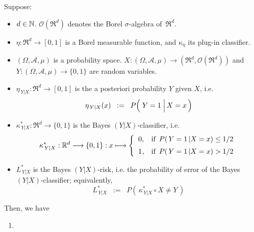 
\vskip 0.5cm
\begin{theorem}
\label{BoundOfProbabilityOfErrorsPlugInClassifier}
\mbox{}\vskip 0.1cm
\noindent
Suppose:
\begin{itemize}
\item
	$d \in \mathbb{N}$.
	$\mathcal{O}(\Re^{d})$ denotes the Borel $\sigma$-algebra of \,$\Re^{d}$.
\item
	$\eta : \Re^{d} \longrightarrow [0,1]$ is a Borel measurable function, and
	$\kappa_{\eta}$ its plug-in classifier.
\item
	$(\Omega,\mathcal{A},\mu)$ is a probability space.
	$X : (\Omega,\mathcal{A},\mu) \longrightarrow (\Re^{d},\mathcal{O}(\Re^{d}))$ and\,
	$Y : (\Omega,\mathcal{A},\mu) \longrightarrow \{0,1\}$
	are random variables.
\item
	$\eta_{\,Y \vert X } : \Re^{d} \longrightarrow [0,1]$ is the a posteriori probability $Y$ given $X$, i.e.
	\begin{equation*}
	\eta_{\,Y \vert X}(x) \;\; := \;\; P\!\left(\,\left. \overset{{\color{white}.}}{Y} = 1 \;\right\vert X = x \,\right)
	\end{equation*}
\item
	$\kappa^{*}_{\,Y \vert X} : \Re^{d} \longrightarrow \{0,1\}$ is the Bayes $(Y \vert X)$-classifier, i.e.
	\begin{equation*}
	\kappa^{*}_{\,Y \vert X} : \Re^{d} \longrightarrow \{0,1\} : x \longmapsto
		\left\{\begin{array}{cl}
			0, & \textnormal{if \,$P(\,Y=1 \,\vert X = x) \leq 1/2$}
			\\
			\overset{{\color{white}-}}{1}, & \textnormal{if \,$P(\,Y=1 \,\vert X = x) > 1/2$}
		\end{array}\right.
	\end{equation*}
\item
	$L^{*}_{\,Y \vert X}$ is the Bayes $(Y \vert X)$-risk,
	i.e. the probability of error of the Bayes $(Y \vert X)$-classifier;
	equivalently,
	\begin{equation*}
	L^{*}_{\,Y \vert X} \;\; := \;\; P\!\left(\, \kappa^{*}_{\,Y \vert X} \circ X \neq Y \,\right)
	\end{equation*}	
\end{itemize}
Then, we have
\begin{enumerate}
\item\label{boundOnProbabilityOrError}
	\begin{eqnarray*}

\end{eqnarray*}
\end{enumerate}
\end{theorem}
